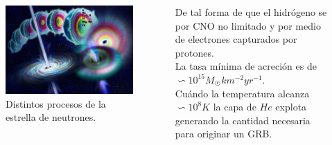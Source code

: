 \documentclass{beamer}
\begin{document}


\begin{frame}
	\begin{columns}
	
		\begin{column}{5cm}
			\begin{figure}
				\centering
				\includegraphics[scale=0.75]{neutronStar.jpg}
				\caption{Distintos procesos de la estrella de neutrones.}
			
			\end{figure}
		\end{column}
		
		\begin{column}{5cm}
		De tal forma de que el hidr\'ogeno se  por CNO no limitado y por medio de electrones 
		capturados por protones.\\ La tasa m\'inima de acreci\'on es de $\backsim 10^{15}M_{\astrosun}km^{-2}yr^{-1}$.\\
		Cu\'ando la temperatura alcanza $\backsim 10^{8}K $ la capa de $He$
		explota generando la cantidad necesaria para originar un GRB.
		\end{column}	
	\end{columns}
\end{frame}


\end{document}
